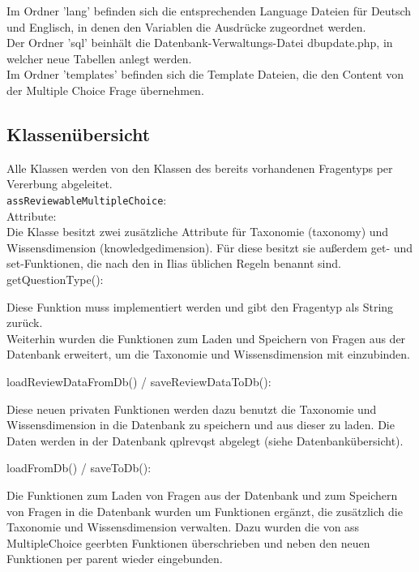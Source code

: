 \documentclass[a4paper]{scrreprt}
\begin{document}
Im Ordner 'lang' befinden sich die entsprechenden Language Dateien für Deutsch und Englisch, in denen den Variablen die Ausdrücke zugeordnet werden.\\
Der Ordner 'sql' beinhält die Datenbank-Verwaltungs-Datei dbupdate.php, in welcher neue Tabellen anlegt werden.\\
Im Ordner 'templates' befinden sich die Template Dateien, die den Content von der Multiple Choice Frage übernehmen.\\


\subsection{Klassenübersicht}

Alle Klassen werden von den Klassen des bereits vorhandenen Fragentyps per Vererbung abgeleitet.\\ 
\texttt{assReviewableMultipleChoice}:\\
Attribute:\\
Die Klasse besitzt zwei zusätzliche Attribute für Taxonomie (taxonomy) und Wissensdimension (knowledge\textunderscore dimension).
Für diese besitzt sie außerdem get- und set-Funktionen, die nach den in Ilias üblichen Regeln benannt sind. \\

getQuestionType():

Diese Funktion muss implementiert werden und gibt den Fragentyp als String zurück.\\


Weiterhin wurden die Funktionen zum Laden und Speichern von Fragen aus der Datenbank erweitert, um die Taxonomie und Wissensdimension mit einzubinden.

loadReviewDataFromDb() / saveReviewDataToDb():

Diese neuen privaten Funktionen werden dazu benutzt die Taxonomie und Wissensdimension in die Datenbank zu speichern und aus dieser zu laden.
Die Daten werden in der Datenbank qpl\textunderscore rev\textunderscore qst abgelegt (siehe Datenbankübersicht).

loadFromDb() / saveToDb():

Die Funktionen zum Laden von Fragen aus der Datenbank und zum Speichern von Fragen in die Datenbank wurden um Funktionen ergänzt, 
die zusätzlich die Taxonomie und Wissensdimension verwalten. 
Dazu wurden die von ass MultipleChoice geerbten Funktionen überschrieben und neben den neuen Funktionen per parent wieder eingebunden.
\end{document}
